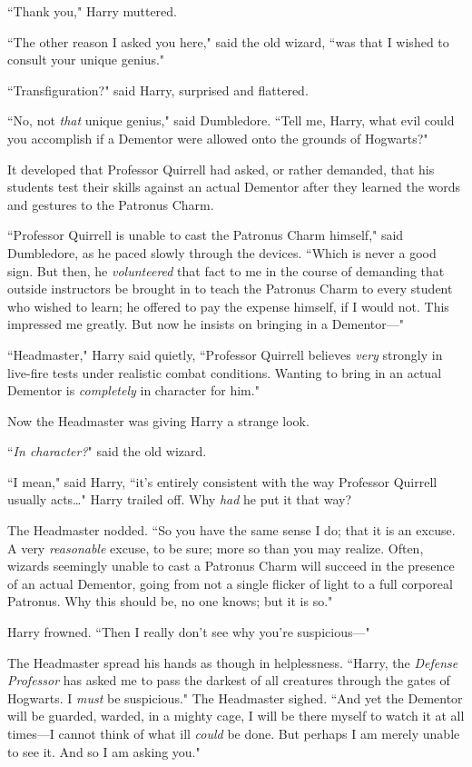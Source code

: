 ``Thank you," Harry muttered.

``The other reason I asked you here," said the old wizard, ``was that I wished to consult your unique genius."

``Transfiguration?" said Harry, surprised and flattered.

``No, not \emph{that} unique genius," said Dumbledore. ``Tell me, Harry, what evil could you accomplish if a Dementor were allowed onto the grounds of Hogwarts?"

\later

It developed that Professor Quirrell had asked, or rather demanded, that his students test their skills against an actual Dementor after they learned the words and gestures to the Patronus Charm.

``Professor Quirrell is unable to cast the Patronus Charm himself," said Dumbledore, as he paced slowly through the devices. ``Which is never a good sign. But then, he \emph{volunteered} that fact to me in the course of demanding that outside instructors be brought in to teach the Patronus Charm to every student who wished to learn; he offered to pay the expense himself, if I would not. This impressed me greatly. But now he insists on bringing in a Dementor—"

``Headmaster," Harry said quietly, ``Professor Quirrell believes \emph{very} strongly in live-fire tests under realistic combat conditions. Wanting to bring in an actual Dementor is \emph{completely} in character for him."

Now the Headmaster was giving Harry a strange look.

``\emph{In character?}" said the old wizard.

``I mean," said Harry, ``it's entirely consistent with the way Professor Quirrell usually acts{\ldots}" Harry trailed off. Why \emph{had} he put it that way?

The Headmaster nodded. ``So you have the same sense I do; that it is an excuse. A very \emph{reasonable} excuse, to be sure; more so than you may realize. Often, wizards seemingly unable to cast a Patronus Charm will succeed in the presence of an actual Dementor, going from not a single flicker of light to a full corporeal Patronus. Why this should be, no one knows; but it is so."

Harry frowned. ``Then I really don't see why you're suspicious—"

The Headmaster spread his hands as though in helplessness. ``Harry, the \emph{Defense Professor} has asked me to pass the darkest of all creatures through the gates of Hogwarts. I \emph{must} be suspicious." The Headmaster sighed. ``And yet the Dementor will be guarded, warded, in a mighty cage, I will be there myself to watch it at all times—I cannot think of what ill \emph{could} be done. But perhaps I am merely unable to see it. And so I am asking you."

